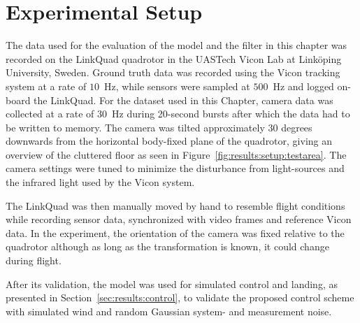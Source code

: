 \section{Experimental Setup}
\label{sec:results:setup}
    The data used for the evaluation of the model and the filter in
    this chapter was recorded on the LinkQuad quadrotor in the UASTech Vicon Lab
    at Linköping University, Sweden. Ground truth data was recorded using
    the Vicon tracking system at a rate of $10$~Hz, while sensors were sampled
    at $500$~Hz and logged on-board the LinkQuad.
    For the dataset used in this Chapter,
    camera data was collected at a rate of $30$~Hz during 20-second bursts after
    which the data had to be written to memory.
    The camera was tilted approximately $30$ degrees downwards from the
    horizontal body-fixed plane of the quadrotor, giving an overview of the cluttered
    floor as seen in Figure~\ref{fig:results:setup:testarea}.
    The camera settings were tuned to minimize the disturbance from light-sources
    and the infrared light used by the Vicon system.

    The LinkQuad was then manually moved by hand to resemble flight conditions
    while recording sensor data, synchronized with video frames and reference Vicon data.
    In the experiment, the orientation of the camera was fixed relative to the 
    quadrotor although as long as the transformation is known, it could change during flight.


    After its validation, the model was used for simulated
    control and landing, as presented in Section~\ref{sec:results:control},
    to validate the proposed control scheme with simulated wind and 
    random Gaussian system- and measurement noise.
